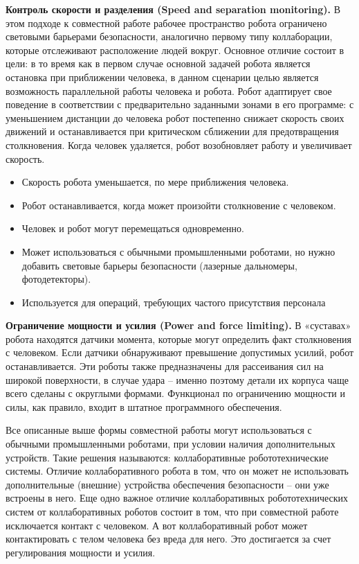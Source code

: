 \textbf{Контроль скорости и разделения (Speed and separation monitoring).}
В этом подходе к совместной работе рабочее пространство робота ограничено световыми барьерами безопасности, аналогично первому типу коллаборации, которые отслеживают расположение людей вокруг. Основное отличие состоит в цели: в то время как в первом случае основной задачей робота является остановка при приближении человека, в данном сценарии целью является возможность параллельной работы человека и робота. Робот адаптирует свое поведение в соответствии с предварительно заданными зонами в его программе: с уменьшением дистанции до человека робот постепенно снижает скорость своих движений и останавливается при критическом сближении для предотвращения столкновения. Когда человек удаляется, робот возобновляет работу и увеличивает скорость.
\begin{itemize}
	\item Скорость робота уменьшается, по мере приближения человека.
	\item Робот останавливается, когда может произойти столкновение с человеком.
	\item Человек и робот могут перемещаться одновременно.
	\item Может использоваться с обычными промышленными роботами, но нужно добавить световые барьеры безопасности (лазерные дальномеры, фотодетекторы).
	\item Используется для операций, требующих частого присутствия персонала
\end{itemize}

\textbf{Ограничение мощности и усилия (Power and force limiting).} В «суставах» робота находятся датчики момента, которые могут определить факт столкновения с человеком. Если датчики обнаруживают превышение допустимых усилий, робот останавливается. Эти роботы также предназначены для рассеивания сил на широкой поверхности, в случае удара – именно поэтому детали их корпуса чаще всего сделаны с округлыми формами. Функционал по ограничению мощности и силы, как правило, входит в штатное программного обеспечения.

Все описанные выше формы совместной работы могут использоваться с обычными промышленными роботами, при условии наличия дополнительных устройств. Такие решения называются: коллаборативные робототехнические системы. Отличие коллаборативного робота в том, что он может не использовать дополнительные (внешние) устройства обеспечения безопасности – они уже встроены в него. Еще одно важное отличие коллаборативных робототехнических систем от коллаборативных роботов состоит в том, что при совместной работе исключается контакт с человеком. А вот коллаборативный робот может контактировать с телом человека без вреда для него. Это достигается за счет регулирования мощности и усилия.

